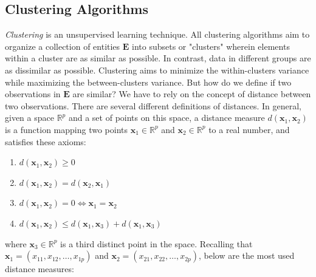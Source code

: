 
\subsection{Clustering Algorithms}
\label{sec:clustering}
\emph{Clustering} is an unsupervised learning technique. All clustering algorithms aim to organize a collection of entities $\mathbf{E}$ into subsets or "clusters" wherein elements within a cluster are as similar as possible. In contrast, data in different groups are as dissimilar as possible. Clustering aims to minimize the within-clusters variance while maximizing the between-clusters variance. But how do we define if two observations in $\mathbf{E}$ are similar? We have to rely on the concept of distance between two observations. There are several different definitions of distances. In general, given a space $\mathbb{R}^p$ and a set of points on this space, a distance measure $d\left(\mathbf{x}_1,\mathbf{x}_2\right)$ is a function mapping two points $\mathbf{x}_1\in\mathbb{R}^p$ and $\mathbf{x}_2\in\mathbb{R}^p$ to a real number, and satisfies these axioms:
\begin{enumerate}
    \item $d\left(\mathbf{x}_1,\mathbf{x}_2\right) \geq 0$
    \item $d\left(\mathbf{x}_1,\mathbf{x}_2\right) = d\left(\mathbf{x}_2,\mathbf{x}_1\right)$
    \item $d\left(\mathbf{x}_1,\mathbf{x}_2\right)=0 \Leftrightarrow \mathbf{x}_1 = \mathbf{x}_2$
    \item $d\left(\mathbf{x}_1,\mathbf{x}_2\right) \leq d\left(\mathbf{x}_1,\mathbf{x}_3\right) + d\left(\mathbf{x}_1,\mathbf{x}_3\right)$
\end{enumerate}
where $\mathbf{x}_3 \in \mathbb{R}^p$ is a third distinct point in the space. Recalling that $\mathbf{x}_1=\left(x_{11}, x_{12}, \dots, x_{1p} \right)$ and $\mathbf{x}_2=\left(x_{21}, x_{22}, \dots, x_{2p} \right)$, below are the most used distance measures:
